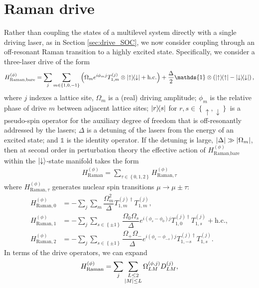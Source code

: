 \documentclass[nofootinbib,notitlepage,11pt]{revtex4-2}
\renewcommand{\t}{\text} %
\newcommand{\f}[2]{\dfrac{#1}{#2}} %
\newcommand{\p}[1]{\left(#1\right)} %
\renewcommand{\set}[1]{\left\{#1\right\}} %
\newcommand{\1}{\mathds{1}}
\newcommand{\up}{\uparrow}
\newcommand{\dn}{\downarrow}
\begin{document}
\section{Raman drive}
\label{sec:drive_raman}

Rather than coupling the states of a multilevel system directly with a
single driving laser, as in Section \ref{sec:drive_SOC}, we now
consider coupling through an off-resonant Raman transition to a highly
excited state.  Specifically, we consider a three-laser drive of the
form
\begin{align}
  H_{\t{Raman,bare}}^{(\phi)}
  = \sum_j \sum_{m\in\set{1,0,-1}} \p{\Omega_m e^{i\phi_m j}
    T_{1,m}^{(j)} \otimes \op{\up}{\dn} + \t{h.c.}}
  + \f{\Delta}{2} \1 \otimes \p{\op{\up} - \op{\dn}},
  \label{eq:raman_bare}
\end{align}
where $j$ indexes a lattice site, $\Omega_m$ is a (real) driving
amplitude; $\phi_m$ is the relative phase of drive $m$ between
adjacent lattice sites; $\op{r}{s}$ for $r,s\in\set{\up,\dn}$ is a
pseudo-spin operator for the auxiliary degree of freedom that is
off-resonantly addressed by the lasers; $\Delta$ is a detuning of the
lasers from the energy of an excited state; and $\1$ is the identity
operator.  If the detuning is large, $\abs{\Delta}\gg\abs{\Omega_m}$,
then at second order in perturbation theory the effective action of
$H_{\t{Raman,bare}}^{(\phi)}$ within the $\ket{\dn}$-state manifold
takes the form
\begin{align}
  H_{\t{Raman}}^{(\phi)}
  = \sum_{\tau\in\set{0,1,2}} H_{\t{Raman},\tau}^{(\phi)}
\end{align}
where $H_{\t{Raman},\tau}^{(\phi)}$ generates nuclear spin transitions
$\mu\to\mu\pm\tau$:
\begin{align}
  H_{\t{Raman},0}^{(\phi)}
  &= -\sum_j\sum_m \f{\Omega_m^2}{\Delta}
  T_{1,m}^{(j)\dag} T_{1,m}^{(j)},
  \label{eq:raman_0} \\
  H_{\t{Raman},1}^{(\phi)}
  &= -\sum_j\sum_{s\in\set{\pm1}}
  \f{\Omega_0\Omega_s}{\Delta} e^{i\p{\phi_s-\phi_0} j}
  T_{1,0}^{(j)\dag} T_{1,s}^{(j)} + \t{h.c.},
  \\
  H_{\t{Raman},2}^{(\phi)}
  &= -\sum_j\sum_{s\in\set{\pm1}}
  \f{\Omega_+\Omega_-}{\Delta} e^{i\p{\phi_s-\phi_{-s}}j}
  T_{1,-s}^{(j)\dag} T_{1,s}^{(j)}.
  \label{eq:raman_2}
\end{align}
In terms of the drive operators, we can expand
\begin{align}
  H_{\t{Raman}}^{(\phi)}
  = \sum_j \sum_{\substack{L\le2\\\abs{M}\le L}}
  \Omega_{LM}^{(\phi,j)} D_{LM}^{(j)},
  \label{eq:raman_drive}
\end{align}
\end{document}
